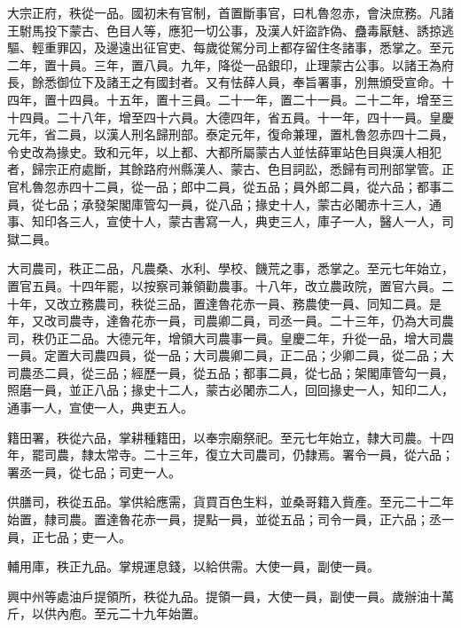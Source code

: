 
\begin{pinyinscope}

 大宗正府，秩從一品。國初未有官制，首置斷事官，曰札魯忽赤，會決庶務。凡諸王駙馬投下蒙古、色目人等，應犯一切公事，及漢人奸盜詐偽、蠱毒厭魅、誘掠逃驅、輕重罪囚，及邊遠出征官吏、每歲從駕分司上都存留住冬諸事，悉掌之。至元二年，置十員。三年，置八員。九年，降從一品銀印，止理蒙古公事。以諸王為府長，餘悉御位下及諸王之有國封者。又有怯薛人員，奉旨署事，別無頒受宣命。十四年，置十四員。十五年，置十三員。二十一年，置二十一員。二十二年，增至三十四員。二十八年，增至四十六員。大德四年，省五員。十一年，四十一員。皇慶元年，省二員，以漢人刑名歸刑部。泰定元年，復命兼理，置札魯忽赤四十二員，令史改為掾史。致和元年，以上都、大都所屬蒙古人並怯薛軍站色目與漢人相犯者，歸宗正府處斷，其餘路府州縣漢人、蒙古、色目詞訟，悉歸有司刑部掌管。正官札魯忽赤四十二員，從一品；郎中二員，從五品；員外郎二員，從六品；都事二員，從七品；承發架閣庫管勾一員，從八品；掾史十人，蒙古必闍赤十三人，通事、知印各三人，宣使十人，蒙古書寫一人，典吏三人，庫子一人，醫人一人，司獄二員。



 大司農司，秩正二品，凡農桑、水利、學校、饑荒之事，悉掌之。至元七年始立，置官五員。十四年罷，以按察司兼領勸農事。十八年，改立農政院，置官六員。二十年，又改立務農司，秩從三品，置達魯花赤一員、務農使一員、同知二員。是年，又改司農寺，達魯花赤一員，司農卿二員，司丞一員。二十三年，仍為大司農司，秩仍正二品。大德元年，增領大司農事一員。皇慶二年，升從一品，增大司農一員。定置大司農四員，從一品；大司農卿二員，正二品；少卿二員，從二品；大司農丞二員，從三品；經歷一員，從五品；都事二員，從七品；架閣庫管勾一員，照磨一員，並正八品；掾史十二人，蒙古必闍赤二人，回回掾史一人，知印二人，通事一人，宣使一人，典吏五人。



 籍田署，秩從六品，掌耕種籍田，以奉宗廟祭祀。至元七年始立，隸大司農。十四年，罷司農，隸太常寺。二十三年，復立大司農司，仍隸焉。署令一員，從六品；署丞一員，從七品；司吏一人。



 供膳司，秩從五品。掌供給應需，貨買百色生料，並桑哥籍入貲產。至元二十二年始置，隸司農。置達魯花赤一員，提點一員，並從五品；司令一員，正六品；丞一員，正七品；吏一人。



 輔用庫，秩正九品。掌規運息錢，以給供需。大使一員，副使一員。



 興中州等處油戶提領所，秩從九品。提領一員，大使一員，副使一員。歲辦油十萬斤，以供內庖。至元二十九年始置。




\end{pinyinscope}
